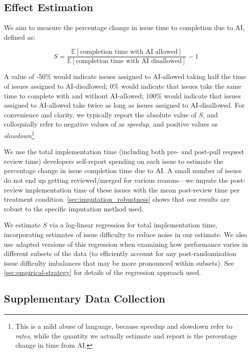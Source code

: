 \documentclass{article}
\begin{document}
\subsection{Effect Estimation}
\label{sec:effect_estimation}

We aim to measure the percentage change in issue time to completion due to AI, defined as:

$$S = \frac{\mathbb{E}[\text{completion time with AI allowed}]}{\mathbb{E}[\text{completion time with AI disallowed}]} - 1$$

A value of -50\% would indicate issues assigned to AI-allowed taking half the time of issues assigned to AI-disallowed; 0\% would indicate that issues take the same time to complete with and without AI-allowed; 100\% would indicate that issues assigned to AI-allowed take twice as long as issues assigned to AI-disallowed. For convenience and clarity, we typically report the absolute value of $S$, and colloquially refer to negative values of as \textit{speedup}, and positive values as \textit{slowdown}\footnote{This is a mild abuse of language, because speedup and slowdown refer to \textit{rates}, while the quantity we actually estimate and report is the percentage change in time from AI.}

We use the total implementation time (including both pre- and post-pull request review time) developers self-report spending on each issue to estimate the percentage change in issue completion time due to AI. A small number of issues do not end up getting reviewed/merged for various reasons---we impute the post-review implementation time of these issues with the mean post-review time per treatment condition. \autoref{sec:imputation_robustness} shows that our results are robust to the specific imputation method used.

We estimate $S$ via a log-linear regression for total implementation time, incorporating estimates of issue difficulty to reduce noise in our estimate. We also use adapted versions of this regression when examining how performance varies in different subsets of the data (to efficiently account for any post-randomization issue difficulty imbalances that may be more pronounced within subsets). See \autoref{sec:empirical-strategy} for details of the regression approach used. 

\subsection{Supplementary Data Collection}
\end{document}
